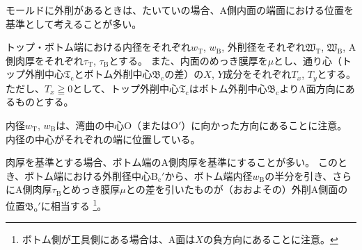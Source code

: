 モールドに外削があるときは、たいていの場合、A側内面の端面における位置を基準として考えることが多い。

トップ・ボトム端における内径をそれぞれ$w_\mathrm T$, $w_\mathrm B$, 外削径をそれぞれ$\mathfrak W_\mathrm T$, $\mathfrak W_\mathrm B$, A側肉厚をそれぞれ$\tau_\mathrm T$, $\tau_\mathrm B$とする。
また、内面のめっき膜厚を$\mu$とし、通り心（トップ外削中心$\mathfrak T_\mathrm c$とボトム外削中心$\mathfrak B_\mathrm c$の差）の$X$, $Y$成分をそれぞれ$T_x$, $T_y$とする。
ただし、$T_x \geqq 0$として、トップ外削中心$\mathfrak T_\mathrm c$はボトム外削中心$\mathfrak B_\mathrm c$よりA面方向にあるものとする。
\begin{hosoku}
内径$w_\mathrm T$, $w_\mathrm B$は、湾曲の中心O（またはO$'$）に向かった方向にあることに注意。
内径の中心がそれぞれの端に位置している。
\end{hosoku}



肉厚を基準とする場合、ボトム端のA側肉厚を基準にすることが多い。
このとき、ボトム端における外削径中心B$_\mathrm c'$から、ボトム端内径$w_\mathrm B$の半分を引き、さらにA側肉厚$\tau_\mathrm B$とめっき膜厚$\mu$との差を引いたものが（おおよその）外削A側面の位置$\mathfrak B_\mathrm o'$に相当する
\footnote{ボトム側が工具側にある場合は、A面は$X$の負方向にあることに注意。}。


